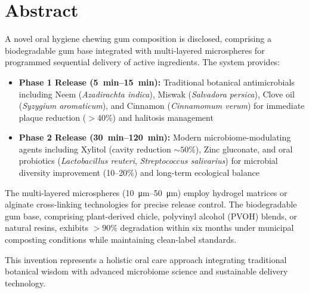 \documentclass[12pt]{article}
\begin{document}
\section*{Abstract}

A novel oral hygiene chewing gum composition is disclosed, comprising a biodegradable gum base integrated with multi-layered microspheres for programmed sequential delivery of active ingredients. The system provides:

\begin{itemize}
    \item \textbf{Phase 1 Release (\SIrange{5}{15}{\minute}):} Traditional botanical antimicrobials including Neem (\textit{Azadirachta indica}), Miswak (\textit{Salvadora persica}), Clove oil (\textit{Syzygium aromaticum}), and Cinnamon (\textit{Cinnamomum verum}) for immediate plaque reduction ($>40\%$) and halitosis management
    
    \item \textbf{Phase 2 Release (\SIrange{30}{120}{\minute}):} Modern microbiome-modulating agents including Xylitol (cavity reduction $\sim50\%$), Zinc gluconate, and oral probiotics (\textit{Lactobacillus reuteri}, \textit{Streptococcus salivarius}) for microbial diversity improvement (10--20\%) and long-term ecological balance
\end{itemize}

The multi-layered microspheres (\SIrange{10}{50}{\micro\meter}) employ hydrogel matrices or alginate cross-linking technologies for precise release control. The biodegradable gum base, comprising plant-derived chicle, polyvinyl alcohol (PVOH) blends, or natural resins, exhibits $>90\%$ degradation within six months under municipal composting conditions while maintaining clean-label standards.

This invention represents a holistic oral care approach integrating traditional botanical wisdom with advanced microbiome science and sustainable delivery technology.
\end{document}
